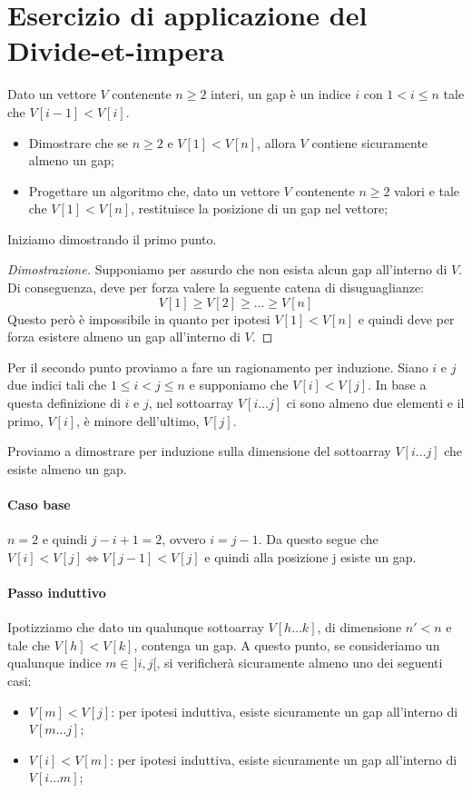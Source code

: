 \section{Esercizio di applicazione del Divide-et-impera}
\begin{problem}
    Dato un vettore $V$ contenente $n\geq 2$ interi, un gap è un indice $i$ con
    $1<i\leq n$ tale che $V[i-1]<V[i]$.
    \begin{itemize}
        \item Dimostrare che se $n\geq2$ e $V[1]<V[n]$, allora $V$ contiene
        sicuramente almeno un gap;
        \item Progettare un algoritmo che, dato un vettore $V$ contenente $n\geq 2$
        valori e tale che $V[1]<V[n]$, restituisce la posizione di un gap nel vettore;        
    \end{itemize}

    \bigskip\noindent
    Iniziamo dimostrando il primo punto.
    \begin{proof}[Dimostrazione]
        Supponiamo per assurdo che non esista alcun gap all'interno di $V$. Di
        conseguenza, deve per forza valere la seguente catena di disuguaglianze:
        \[V[1]\geq V[2]\geq\dots\geq V[n]\]
        Questo però è impossibile in quanto per ipotesi $V[1]<V[n]$ e quindi deve
        per forza esistere almeno un gap all'interno di $V$.
    \end{proof}

    \noindent
    Per il secondo punto proviamo a fare un ragionamento per induzione.
    Siano $i$ e $j$ due indici tali che $1\leq i<j\leq n$ e supponiamo che $V[i]
    <V[j]$. In base a questa definizione di $i$ e $j$, nel sottoarray $V[i\dots j]$
    ci sono almeno due elementi e il primo, $V[i]$, è minore dell'ultimo, $V[j]$.

    Proviamo a dimostrare per induzione sulla dimensione del sottoarray
    $V[i\dots j]$ che esiste almeno un gap.
    \paragraph{Caso base} $n = 2$ e quindi $j-i+1=2$, ovvero $i=j-1$. Da questo
    segue che $V[i]<V[j]\Leftrightarrow V[j-1]<V[j]$ e quindi alla posizione j
    esiste un gap.

    \paragraph{Passo induttivo} Ipotizziamo che dato un qualunque sottoarray
    $V[h\dots k]$, di dimensione $n'<n$ e tale che $V[h]<V[k]$, contenga
    un gap. A questo punto, se consideriamo un qualunque indice $m\in\,]i,j[$,
    si verificherà sicuramente almeno uno dei seguenti casi:
    \begin{itemize}
        \item $V[m]<V[j]$: per ipotesi induttiva, esiste sicuramente un gap
        all'interno di $V[m\dots j]$;
        \item $V[i]<V[m]$: per ipotesi induttiva, esiste sicuramente un gap
        all'interno di $V[i\dots m]$;
    \end{itemize} 


\end{problem}
